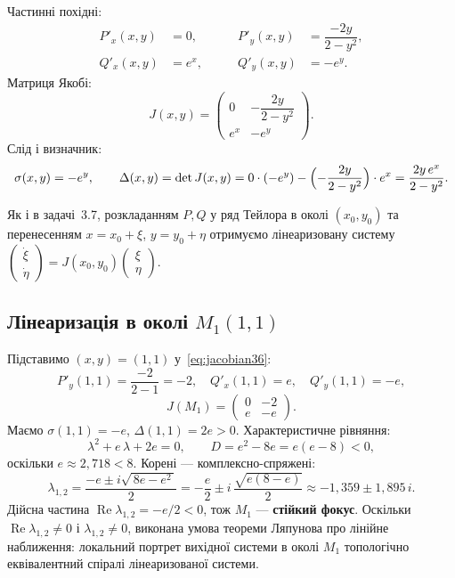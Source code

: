 \documentclass[12pt,a4paper]{article}
\begin{document}
Частинні похідні:
\begin{align*}
P'_x(x,y) &= 0, &\qquad P'_y(x,y) &= \dfrac{-2y}{2-y^2},\\
Q'_x(x,y) &= e^{x}, &\qquad Q'_y(x,y) &= -e^{y}.
\end{align*}
Матриця Якобі:
\begin{equation}\label{eq:jacobian36}
J(x,y)=
\begin{pmatrix}
0 & -\dfrac{2y}{2-y^2}\\[2mm]
e^{x} & -e^{y}
\end{pmatrix}.
\end{equation}
Слід і визначник:
\begin{equation*}
\sigma(x,y)=-e^{y},\qquad
\Delta(x,y)=\det J(x,y)=0\cdot(-e^{y})-\Bigl(-\dfrac{2y}{2-y^2}\Bigr)\cdot e^{x}
=\dfrac{2y\,e^{x}}{2-y^2}.
\end{equation*}

Як і в задачі~3.7, розкладанням $P,Q$ у ряд Тейлора в околі $(x_0,y_0)$ та перенесенням $x=x_0+\xi$, $y=y_0+\eta$ отримуємо лінеаризовану систему
$\begin{pmatrix}\dot\xi\\ \dot\eta\end{pmatrix}=J(x_0,y_0)\begin{pmatrix}\xi\\ \eta\end{pmatrix}$.

\subsection{Лінеаризація в околі $M_1(1,1)$}

Підставимо $(x,y)=(1,1)$ у~\eqref{eq:jacobian36}:
\begin{equation*}
P'_y(1,1)=\dfrac{-2}{2-1}=-2,\quad Q'_x(1,1)=e,\quad Q'_y(1,1)=-e,
\end{equation*}
\begin{equation*}
J(M_1)=
\begin{pmatrix}
0 & -2\\
e & -e
\end{pmatrix}.
\end{equation*}
Маємо $\sigma(1,1)=-e$, $\Delta(1,1)=2e>0$. Характеристичне рівняння:
\begin{equation*}
\lambda^2+e\,\lambda+2e=0,\qquad D=e^2-8e=e(e-8)<0,
\end{equation*}
оскільки $e\approx 2{,}718<8$. Корені --- комплексно-спряжені:
\begin{equation*}
\lambda_{1,2}=\dfrac{-e\pm i\sqrt{\,8e-e^2\,}}{2}
=-\dfrac{e}{2}\pm i\,\dfrac{\sqrt{e(8-e)}}{2}
\approx -1{,}359\pm 1{,}895\,i.
\end{equation*}
Дійсна частина $\operatorname{Re}\lambda_{1,2}=-e/2<0$, тож $M_1$ --- \textbf{стійкий фокус}.
Оскільки $\operatorname{Re}\lambda_{1,2}\neq 0$ і $\lambda_{1,2}\neq 0$, виконана умова теореми Ляпунова про лінійне наближення: локальний портрет вихідної системи в околі $M_1$ топологічно еквівалентний спіралі лінеаризованої системи.
\end{document}
